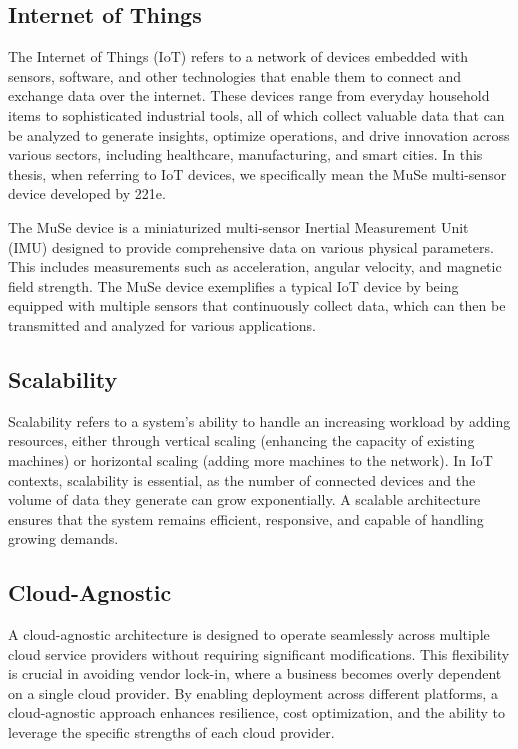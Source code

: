 \subsection*{Internet of Things}
\label{sec:internet-of-things}
The Internet of Things (IoT) refers to a network of devices embedded with sensors, software, and other technologies that enable them to connect and exchange data over the internet. These devices range from everyday household items to sophisticated industrial tools, all of which collect valuable data that can be analyzed to generate insights, optimize operations, and drive innovation across various sectors, including healthcare, manufacturing, and smart cities.  In this thesis, when referring to IoT devices, we specifically mean the MuSe multi-sensor device developed by 221e\cite{site:221e}.

The MuSe device is a miniaturized multi-sensor Inertial Measurement Unit (IMU) designed to provide comprehensive data on various physical parameters. This includes measurements such as acceleration, angular velocity, and magnetic field strength. The MuSe device exemplifies a typical IoT device by being equipped with multiple sensors that continuously collect data, which can then be transmitted and analyzed for various applications.

\subsection*{Scalability}
\label{sec:scalability}
Scalability refers to a system's ability to handle an increasing workload by adding resources, either through vertical scaling (enhancing the capacity of existing machines) or horizontal scaling (adding more machines to the network). In IoT contexts, scalability is essential, as the number of connected devices and the volume of data they generate can grow exponentially. A scalable architecture ensures that the system remains efficient, responsive, and capable of handling growing demands.

\subsection*{Cloud-Agnostic}
\label{sec:cloud-agnostic}
A cloud-agnostic architecture is designed to operate seamlessly across multiple cloud service providers without requiring significant modifications. This flexibility is crucial in avoiding vendor lock-in, where a business becomes overly dependent on a single cloud provider. By enabling deployment across different platforms, a cloud-agnostic approach enhances resilience, cost optimization, and the ability to leverage the specific strengths of each cloud provider.

